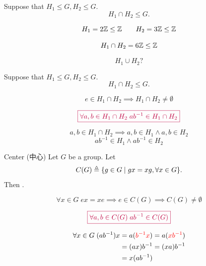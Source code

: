 \begin{frame}
  \begin{theorem}
    Suppose that $H_{1} \le G, H_{2} \le G$.
    \[
      H_{1} \cap H_{2} \le G.
    \]
  \end{theorem}

  \pause
  \[
    H_{1} = 2\mathbb{Z} \le \mathbb{Z} \qquad H_{2} = 3\mathbb{Z} \le \mathbb{Z}
  \]

  \pause
  \[
    H_{1} \cap H_{2} = 6\mathbb{Z} \le \mathbb{Z}
  \]

  \pause
  \[
    H_{1} \cup H_{2} ?
  \]
\end{frame}

\begin{frame}
  \begin{theorem}
    Suppose that $H_{1} \le G, H_{2} \le G$.
    \[
      H_{1} \cap H_{2} \le G.
    \]
  \end{theorem}

  \pause
  \[
    e \in H_{1} \cap H_{2} \implies H_{1} \cap H_{2} \neq \emptyset
  \]

  \pause
  \[
    \textcolor{purple}{\boxed{\forall a, b \in H_{1} \cap H_{2}\; a b^{-1} \in H_{1} \cap H_{2}}}
  \]

  \pause
  \[
    a, b \in H_{1} \cap H_{2} \implies a, b \in H_{1} \land a, b \in H_{2}
  \]
  \pause
  \[
    a b^{-1} \in H_{1} \land a b^{-1} \in H_{2}
  \]
\end{frame}

\begin{frame}
  \begin{exampleblock}{Center (中心)}
    Let $G$ be a group. Let
    \[
      C(G) \triangleq \{g \in G \mid gx = xg, \forall x \in G\}.
    \]
    Then .
  \end{exampleblock}

  \pause
  \[
    \forall x \in G\; e x = x e \implies e \in C(G) \implies C(G) \neq \emptyset
  \]

  \pause
  \[
    \textcolor{purple}{\boxed{\forall a, b \in C(G)\; a b^{-1} \in C(G)}}
  \]

  \pause
  \begin{align*}
    \forall x \in G\; (a b^{-1}) x
      &= a (\textcolor{red}{b^{-1} x}) = a (\textcolor{red}{x b^{-1}}) \\
      &= (a x) b^{-1} = (x a) b^{-1} \\
      &= x (a b^{-1})
  \end{align*}
\end{frame}

\begin{frame}
\end{frame}
